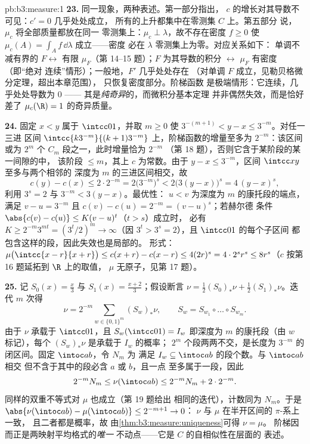 \begin{solution}{pb:b3:measure:1}
\textbf{23.} 同一现象，两种表述。第一部分指出，
$c$ 的增长对其导数不可见：$c' = 0$ 几乎处处成立，
所有的上升都集中在零测集 $C$ 上。第五部分
说， $\mu_c$ 将全部质量都放在同一
零测集上：$\mu_c \perp \lambda$，故不存在密度 $f \geq
0$ 使 $\mu_c(A) = \int_Af\,\dd\lambda$ 成立——密度
必在 $\lambda$ 零测集上为零。对应关系如下：
单调不减有界的 $F \leftrightarrow$ 有限
$\mu_F$（第 14--15 题）；$F$ 为其导数的积分
$\leftrightarrow$ $\mu_F$ 有密度（即“绝对
连续”情形）；一般地，$F'$ 几乎处处存在
（对单调 $F$ 成立，见勒贝格微分定理，超出本章范围），
只恢复密度部分。阶梯函数
是极端情形：它连续，几乎处处导数为 $0$ ——
其是\emph{纯奇异}的，而微积分基本定理
并非偶然失效，而是恰好差了
$\mu_c(\R) = 1$ 的奇异质量。

\textbf{24.} 固定 $x < y$ 属于 $\intcc01$，并取 $m \geq 0$
使 $3^{-(m+1)} < y - x \leq 3^{-m}$。对任一三进
区间 $\intcc{k3^{-m}}{(k+1)3^{-m}}$ 上，阶梯函数的增量至多为
$2^{-m}$：该区间或为 $2^m$
个 $C_m$ 段之一，此时增量恰为 $2^{-m}$
（第 18 题），否则它含于某阶段的某一间隙的中，
该阶段 $\leq m$，其上 $c$ 为常数。由于 $y - x \leq
3^{-m}$，区间 $\intcc xy$ 至多与两个相邻的
深度为 $m$ 的三进区间相交，故
\[
c(y) - c(x) \leq 2\cdot2^{-m}
= 2\bigl(3^{-m}\bigr)^{s}
< 2\bigl(3(y - x)\bigr)^{s}
= 4\,(y - x)^{s},
\]
利用 $3^{s} = 2$ 与 $3^{-m} < 3(y - x)$。最优性：
$u < v$ 为深度为 $m$ 的康托段的端点，满足 $v - u =
3^{-m}$ 且 $c(v) - c(u) = 2^{-m} = (v - u)^{s}$；若赫尔德
条件 $\abs{c(v) - c(u)} \leq K(v - u)^{t}$（$t > s$）成立时，
必有 $K \geq 2^{-m}3^{mt} = (3^{t}/2)^{m} \to \infty$（因
$3^{t} > 3^{s} = 2$），且 $\intcc01$ 的每个子区间
都包含这样的段，因此失效也是局部的。
形式：$\mu\bigl(\intcc{x-r}{x+r}\bigr) \leq
c(x + r) - c(x - r) \leq 4(2r)^{s} = 4\cdot2^{s}r^{s} \leq
8r^{s}$（$c$ 按第 16 题延拓到 $\R$ 上的取值，
$\mu$ 无原子，见第 17 题）。

\textbf{25.} 记 $S_0(x) = \frac x3$ 与 $S_1(x) =
\frac{x+2}3$；假设断言 $\nu = \frac12(S_0)_*\nu +
\frac12(S_1)_*\nu$。迭代 $m$ 次得
\[
\nu = 2^{-m}\sum_{w \in \{0,1\}^m}(S_w)_*\nu,
\qquad S_w = S_{w_1}\circ\dots\circ S_{w_m}.
\]
由于 $\nu$ 承载于 $\intcc01$，且 $S_w(\intcc01) =
I_w$ 即深度为 $m$ 的康托段（由 $w$ 标记），每个
$(S_w)_*\nu$ 是承载于 $I_w$ 的概率；
$2^m$ 个段两两不交，是长度为
$3^{-m}$ 的闭区间。固定 $\intoc ab$，令 $N_m$ 为
满足 $I_w \subseteq \intoc ab$ 的段个数。与 $\intoc ab$ 相交
但不含于其中的段必含 $a$ 或 $b$，且一点
至多属于一段，因此
\[
2^{-m}N_m \leq \nu(\intoc ab) \leq 2^{-m}N_m + 2\cdot2^{-m}.
\]
同样的双重不等式对 $\mu$ 也成立（第 19 题给出
相同的迭代），计数同为 $N_m$。于是
$\abs{\nu(\intoc ab) - \mu(\intoc ab)} \leq 2^{-m+1} \to 0$：
$\nu$ 与 $\mu$ 在半开区间的 $\pi$-系上一致，
且二者都是概率，故
由\cref{thm:b3:measure:uniqueness}可得 $\nu = \mu$。
阶梯因而正是两映射平均格式的\emph{唯一}
不动点——它是 $C$ 的自相似性在层面的
表述。
\end{solution}
